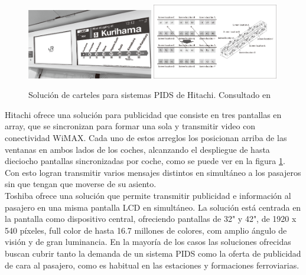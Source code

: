 \begin{figure}[h!]
	\centering
	\includegraphics[width=0.49\textwidth]{./Figures/HitachiCartelPIDS.png}
	\includegraphics[width=0.49\textwidth]{./Figures/HitachiDisplayArray.png}
	\caption{Solución de carteles para sistemas PIDS de Hitachi. Consultado en \citep{Hitachi}}
	\label{fig:Hitachi}
\end{figure}

Hitachi ofrece una solución para publicidad que consiste en tres pantallas en array, que se sincronizan para formar una sola y transmitir video con conectividad WiMAX. Cada uno de estos arreglos los posicionan arriba de las ventanas en ambos lados de los coches, alcanzando el despliegue de hasta dieciocho pantallas sincronizadas por coche, como se puede ver en la figura \ref{fig:Hitachi}. Con esto logran transmitir varios mensajes distintos en simultáneo a los pasajeros sin que tengan que moverse de su asiento.\\


Toshiba ofrece una solución que permite transmitir publicidad e información al pasajero en una misma pantalla LCD en simultáneo. La solución está centrada en la pantalla como dispositivo central, ofreciendo pantallas de 32" y 42", de 1920 x 540 píxeles, full color de hasta 16.7 millones de colores, com amplio ángulo de visión y de gran luminancia\citep{Toshiba}. En la mayoría de los casos las soluciones ofrecidas buscan cubrir tanto la demanda de un sistema PIDS como la oferta de publicidad de cara al pasajero, como es habitual en las estaciones y formaciones ferroviarias.\\



